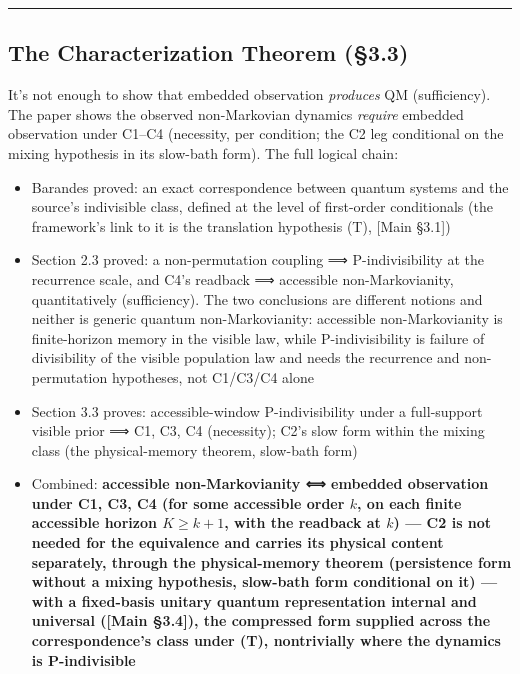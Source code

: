 \documentclass[
]{article}
\providecommand{\tightlist}{%
  \setlength{\itemsep}{0pt}\setlength{\parskip}{0pt}}
\begin{document}
\begin{center}\rule{0.5\linewidth}{0.5pt}\end{center}

\hypertarget{the-characterization-theorem-3.3}{%
\subsection{The Characterization Theorem
(§3.3)}\label{the-characterization-theorem-3.3}}

It's not enough to show that embedded observation \emph{produces} QM
(sufficiency). The paper shows the observed non-Markovian dynamics
\emph{require} embedded observation under C1--C4 (necessity, per
condition; the C2 leg conditional on the mixing hypothesis in its
slow-bath form). The full logical chain:

\begin{itemize}
\tightlist
\item
  Barandes proved: an exact correspondence between quantum systems and
  the source's indivisible class, defined at the level of first-order
  conditionals (the framework's link to it is the translation hypothesis
  (T), {[}Main §3.1{]})
\item
  Section 2.3 proved: a non-permutation coupling ⟹ P-indivisibility at
  the recurrence scale, and C4's readback ⟹ accessible non-Markovianity,
  quantitatively (sufficiency). The two conclusions are different
  notions and neither is generic quantum non-Markovianity: accessible
  non-Markovianity is finite-horizon memory in the visible law, while
  P-indivisibility is failure of divisibility of the visible population
  law and needs the recurrence and non-permutation hypotheses, not
  C1/C3/C4 alone
\item
  Section 3.3 proves: accessible-window P-indivisibility under a
  full-support visible prior ⟹ C1, C3, C4 (necessity); C2's slow form
  within the mixing class (the physical-memory theorem, slow-bath form)
\item
  Combined: \textbf{accessible non-Markovianity ⟺ embedded observation
  under C1, C3, C4 (for some accessible order \(k\), on each finite
  accessible horizon \(K \geq k+1\), with the readback at \(k\)) --- C2
  is not needed for the equivalence and carries its physical content
  separately, through the physical-memory theorem (persistence form
  without a mixing hypothesis, slow-bath form conditional on it) ---
  with a fixed-basis unitary quantum representation internal and
  universal ({[}Main §3.4{]}), the compressed form supplied across the
  correspondence's class under (T), nontrivially where the dynamics is
  P-indivisible}
\end{itemize}
\end{document}
